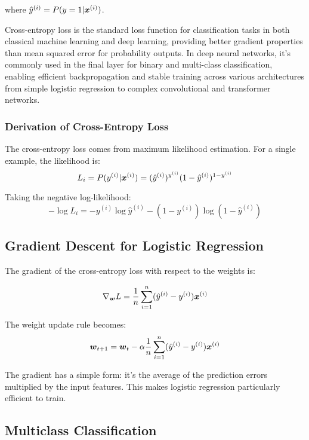 where $\hat{y}^{(i)} = P(y=1|\boldsymbol{x}^{(i)})$.

\begin{remark}
Cross-entropy loss is the standard loss function for classification tasks in both classical machine learning and deep learning, providing better gradient properties than mean squared error for probability outputs. In deep neural networks, it's commonly used in the final layer for binary and multi-class classification, enabling efficient backpropagation and stable training across various architectures from simple logistic regression to complex convolutional and transformer networks.
\end{remark}

\subsubsection{Derivation of Cross-Entropy Loss}

The cross-entropy loss comes from maximum likelihood estimation. For a single example, the likelihood is:
$$L_i = P(y^{(i)}|\boldsymbol{x}^{(i)}) = (\hat{y}^{(i)})^{y^{(i)}} (1-\hat{y}^{(i)})^{1-y^{(i)}}$$

Taking the negative log-likelihood:
$$-\log L_i = -y^{(i)} \log \hat{y}^{(i)} - (1-y^{(i)}) \log(1-\hat{y}^{(i)})$$

\subsection{Gradient Descent for Logistic Regression}

The gradient of the cross-entropy loss with respect to the weights is:

\begin{equation}
\nabla_{\boldsymbol{w}} L = \frac{1}{n} \sum_{i=1}^{n} (\hat{y}^{(i)} - y^{(i)}) \boldsymbol{x}^{(i)}
\end{equation}

The weight update rule becomes:
\begin{equation}
\boldsymbol{w}_{t+1} = \boldsymbol{w}_t - \alpha \frac{1}{n} \sum_{i=1}^{n} (\hat{y}^{(i)} - y^{(i)}) \boldsymbol{x}^{(i)}
\end{equation}

\begin{remark}
The gradient has a simple form: it's the average of the prediction errors multiplied by the input features. This makes logistic regression particularly efficient to train.
\end{remark}

\subsection{Multiclass Classification}

